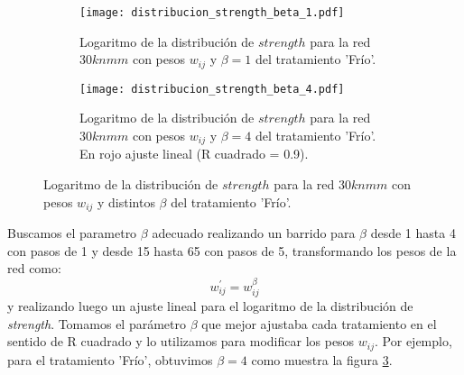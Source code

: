 \begin{figure}[t!]
    \centering
    \begin{subfigure}[t]{0.45\textwidth}
    \centering
    \texttt{[image: distribucion\_strength\_beta\_1.pdf]}
    \caption{Logaritmo de la distribución de $strength$ para la red $30knmm$ con pesos $w_{ij}$ y $\beta=1$ del tratamiento 'Frío'.}
    \label{fig:distribucion_strength_beta_1}
    \end{subfigure}    
    \begin{subfigure}[t]{0.45\textwidth}
    \centering
    \texttt{[image: distribucion\_strength\_beta\_4.pdf]}
    \caption{Logaritmo de la distribución de $strength$ para la red $30knmm$ con pesos $w_{ij}$ y $\beta=4$ del tratamiento 'Frío'. En rojo ajuste lineal (R cuadrado = 0.9).}
    \label{fig:distribucion_strength_beta_4}
    \end{subfigure}    
    \caption{Logaritmo de la distribución de $strength$ para la red $30knmm$ con pesos $w_{ij}$ y distintos $\beta$ del tratamiento 'Frío'.}
\end{figure}
Buscamos el parametro $\beta$ adecuado realizando un barrido para $\beta$ desde 1 hasta 4 con pasos de 1 y desde 15 hasta 65 con pasos de 5, transformando los pesos de la red como:
\begin{equation}
	w_{ij}^{'} = w_{ij}^{\beta}
	\label{eq:pesos_beta}
\end{equation}
y realizando luego un ajuste lineal para el logaritmo de la distribución de \textit{strength}. Tomamos el parámetro $\beta$ que mejor ajustaba cada tratamiento en el sentido de R cuadrado y lo utilizamos para modificar los pesos $w_{ij}$. Por ejemplo, para el tratamiento 'Frío', obtuvimos $\beta=4$ como muestra la figura \ref{fig:distribucion_strength_beta_4}.
